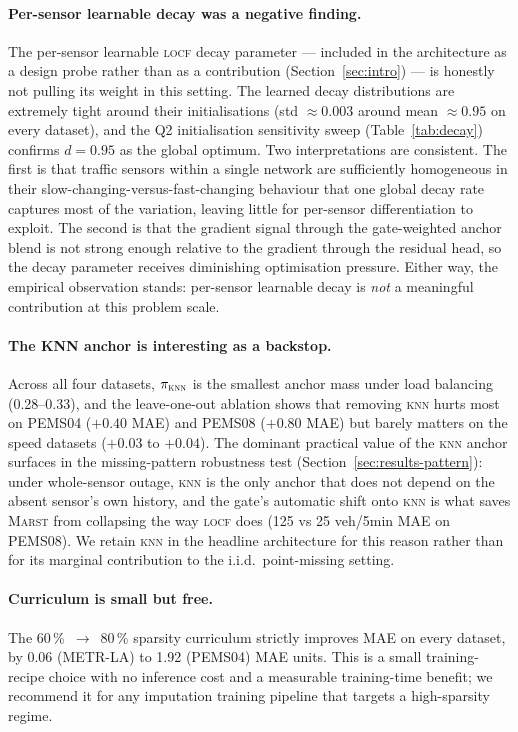 \documentclass[11pt]{article}
\newcommand{\MARST}{\textsc{Marst}\xspace}
\newcommand{\LOCF}{\textsc{locf}\xspace}
\newcommand{\KNN}{\textsc{knn}\xspace}
\begin{document}
\paragraph{Per-sensor learnable decay was a negative finding.}
The per-sensor learnable \LOCF decay parameter --- included in the
architecture as a design probe rather than as a contribution
(Section~\ref{sec:intro}) --- is honestly not pulling its weight in
this setting.  The learned decay distributions are extremely tight
around their initialisations (std $\approx 0.003$ around mean
$\approx 0.95$ on every dataset), and the Q2 initialisation
sensitivity sweep (Table~\ref{tab:decay}) confirms $d = 0.95$ as the
global optimum.  Two interpretations are consistent.  The first is
that traffic sensors within a single network are sufficiently
homogeneous in their slow-changing-versus-fast-changing behaviour
that one global decay rate captures most of the variation, leaving
little for per-sensor differentiation to exploit.  The second is that
the gradient signal through the gate-weighted anchor blend is not
strong enough relative to the gradient through the residual head, so
the decay parameter receives diminishing optimisation pressure.
Either way, the empirical observation stands: per-sensor learnable
decay is \emph{not} a meaningful contribution at this problem scale.

\paragraph{The KNN anchor is interesting as a backstop.}
Across all four datasets, $\pi_{\KNN}$ is the smallest anchor mass
under load balancing (0.28--0.33), and the leave-one-out ablation
shows that removing \KNN hurts most on PEMS04 ($+0.40$ MAE) and
PEMS08 ($+0.80$ MAE) but barely matters on the speed datasets
($+0.03$ to $+0.04$).  The dominant practical value of the \KNN
anchor surfaces in the missing-pattern robustness test
(Section~\ref{sec:results-pattern}): under whole-sensor outage, \KNN
is the only anchor that does not depend on the absent sensor's own
history, and the gate's automatic shift onto \KNN is what saves
\MARST from collapsing the way \LOCF does (125 vs 25 veh/5min MAE on
PEMS08).  We retain \KNN in the headline architecture for this reason
rather than for its marginal contribution to the i.i.d.\ point-missing
setting.

\paragraph{Curriculum is small but free.}
The 60\,\%~$\rightarrow$~80\,\% sparsity curriculum strictly improves
MAE on every dataset, by 0.06 (METR-LA) to 1.92 (PEMS04) MAE units.
This is a small training-recipe choice with no inference cost and a
measurable training-time benefit; we recommend it for any imputation
training pipeline that targets a high-sparsity regime.
\end{document}

